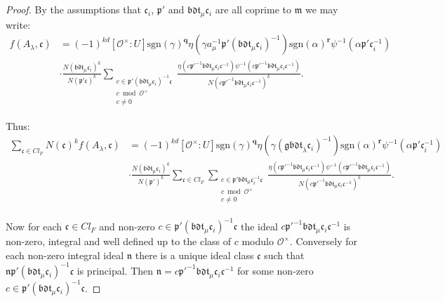 \documentclass[a4paper,oneside]{amsart}
\theoremstyle{plain}
\theoremstyle{definition}
\begin{document}
\begin{proof}
By the assumptions that $\mathfrak{c}_i$, $\mathfrak{p'}$ and $\mathfrak{bdt}_{\mu}\mathfrak{c}_i$ are all coprime to $\mathfrak{m}$ we may write: \begin{align*}f(A_{\lambda},\mathfrak{c}) &= (-1)^{kd}[\mathcal{O}^{\times}:U]\text{sgn}(\gamma)^{\textbf{q}}\eta(\gamma a_{\mu}^{-1}\mathfrak{p'}(\mathfrak{bdt}_{\mu}\mathfrak{c}_i)^{-1})\text{sgn}(\alpha)^{\textbf{r}}\psi^{-1}(\alpha\mathfrak{p'}\mathfrak{c}_i^{-1})\\ &\cdot\frac{N(\mathfrak{bdt}_{\mu}\mathfrak{c}_i)^k}{N(\mathfrak{p'c})^k}\sum_{\substack{c\in\mathfrak{p'}(\mathfrak{bdt}_{\mu}\mathfrak{c}_i)^{-1}\mathfrak{c}\\ c \bmod \mathcal{O}^{\times}\\ c\neq 0}}\frac{\eta(c\mathfrak{p'}^{-1}\mathfrak{bdt}_{\mu}\mathfrak{c}_i\mathfrak{c}^{-1})\psi^{-1}(c\mathfrak{p'}^{-1}\mathfrak{bdt}_{\mu}\mathfrak{c}_i\mathfrak{c}^{-1})}{N(c\mathfrak{p'}^{-1}\mathfrak{bdt}_{\mu}\mathfrak{c}_i\mathfrak{c}^{-1})^k}.\end{align*} 

Thus: \begin{align*} \sum_{\mathfrak{c}\in Cl_F}N(\mathfrak{c})^k f(A_{\lambda},\mathfrak{c}) &= (-1)^{kd}[\mathcal{O}^{\times}:U]\text{sgn}(\gamma)^{\textbf{q}}\eta(\gamma (\mathfrak{gbdt}_{\lambda}\mathfrak{c}_i)^{-1})\text{sgn}(\alpha)^{\textbf{r}}\psi^{-1}(\alpha\mathfrak{p'}\mathfrak{c}_i^{-1})\\ &\cdot\frac{N(\mathfrak{bdt}_{\mu}\mathfrak{c}_i)^k}{N(\mathfrak{p'})^k}\sum_{\mathfrak{c}\in Cl_F}\sum_{\substack{c\in\mathfrak{p'}\mathfrak{bdt}_{\mu}\mathfrak{c}_i^{-1}\mathfrak{c}\\ c \bmod \mathcal{O}^{\times}\\ c\neq 0}}\frac{\eta(c\mathfrak{p'}^{-1}\mathfrak{bdt}_{\mu}\mathfrak{c}_i\mathfrak{c}^{-1})\psi^{-1}(c\mathfrak{p'}^{-1}\mathfrak{bdt}_{\mu}\mathfrak{c}_i\mathfrak{c}^{-1})}{N(c\mathfrak{p'}^{-1}\mathfrak{bdt}_{\mu}\mathfrak{c}_i\mathfrak{c}^{-1})^k}.\end{align*}

Now for each $\mathfrak{c}\in Cl_F$ and non-zero $c\in \mathfrak{p'}(\mathfrak{bdt}_{\mu}\mathfrak{c}_i)^{-1}\mathfrak{c}$ the ideal $c\mathfrak{p'}^{-1}\mathfrak{bdt}_{\mu}\mathfrak{c}_i\mathfrak{c}^{-1}$ is non-zero, integral and well defined up to the class of $c$ modulo $\mathcal{O}^{\times}$. Conversely for each non-zero integral ideal $\mathfrak{n}$ there is a unique ideal class $\mathfrak{c}$ such that $\mathfrak{np'}(\mathfrak{bdt}_{\mu}\mathfrak{c}_i)^{-1}\mathfrak{c}$ is principal. Then $\mathfrak{n} = c\mathfrak{p'}^{-1}\mathfrak{bdt}_{\mu}\mathfrak{c}_i\mathfrak{c}^{-1}$ for some non-zero $c\in \mathfrak{p'}(\mathfrak{bdt}_{\mu}\mathfrak{c}_i)^{-1}\mathfrak{c}$.


\end{proof}
\end{document}
